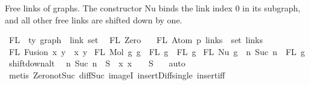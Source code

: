 \begin{isabellebody}
\begin{isamarkuptext}
Free links of graphs.
The constructor Nu binds the link index 0 in its subgraph,
and all other free links are shifted down by one.%
\end{isamarkuptext}\isamarkuptrue%
\isamarkupfalse%
\ FL\ {\isacharcolon}{\kern0pt}{\isacharcolon}{\kern0pt}\ {\isachardoublequoteopen}{\isacharprime}{\kern0pt}ty\ graph\ {\isacharequal}{\kern0pt}{\isachargreater}{\kern0pt}\ link\ set{\isachardoublequoteclose}\isanewline
{}\isanewline
\ \ {\isachardoublequoteopen}FL\ Zero\ {\isacharequal}{\kern0pt}\ {\isacharbraceleft}{\kern0pt}{\isacharbraceright}{\kern0pt}{\isachardoublequoteclose}\isanewline
{\isacharbar}{\kern0pt}\ {\isachardoublequoteopen}FL\ {\isacharparenleft}{\kern0pt}Atom\ p\ links{\isacharparenright}{\kern0pt}\ {\isacharequal}{\kern0pt}\ set\ links{\isachardoublequoteclose}\isanewline
{\isacharbar}{\kern0pt}\ {\isachardoublequoteopen}FL\ {\isacharparenleft}{\kern0pt}Fusion\ x\ y{\isacharparenright}{\kern0pt}\ {\isacharequal}{\kern0pt}\ {\isacharbraceleft}{\kern0pt}x{\isacharcomma}{\kern0pt}\ y{\isacharbraceright}{\kern0pt}{\isachardoublequoteclose}\isanewline
{\isacharbar}{\kern0pt}\ {\isachardoublequoteopen}FL\ {\isacharparenleft}{\kern0pt}Mol\ g{}\ g{}{\isacharparenright}{\kern0pt}\ {\isacharequal}{\kern0pt}\ FL\ g{}\ {\isasymunion}\ FL\ g{}{\isachardoublequoteclose}\isanewline
{\isacharbar}{\kern0pt}\ {\isachardoublequoteopen}FL\ {\isacharparenleft}{\kern0pt}Nu\ g{\isacharparenright}{\kern0pt}\ {\isacharequal}{\kern0pt}\ {\isacharbraceleft}{\kern0pt}n{\isachardot}{\kern0pt}\ Suc\ n\ {\isasymin}\ FL\ g{\isacharbraceright}{\kern0pt}{\isachardoublequoteclose}\isanewline
\isanewline
\isanewline
{}\isamarkupfalse%
\ shift{\isacharunderscore}{\kern0pt}down{\isacharunderscore}{\kern0pt}alt{\isacharcolon}{\kern0pt}\isanewline
\ \ {\isachardoublequoteopen}{\isacharbraceleft}{\kern0pt}n{\isachardot}{\kern0pt}\ Suc\ n\ {\isasymin}\ S{\isacharbraceright}{\kern0pt}\ {\isacharequal}{\kern0pt}\ {\isacharparenleft}{\kern0pt}{\isasymlambda}x{\isachardot}{\kern0pt}\ x\ {\isacharminus}{\kern0pt}\ {}{\isacharparenright}{\kern0pt}\ {\isacharbackquote}{\kern0pt}\ {\isacharparenleft}{\kern0pt}S\ {\isacharminus}{\kern0pt}\ {\isacharbraceleft}{\kern0pt}{}{\isacharbraceright}{\kern0pt}{\isacharparenright}{\kern0pt}{\isachardoublequoteclose}\isanewline
%
\isadelimproof
%
\endisadelimproof
%
\isatagproof
{}\isamarkupfalse%
\ auto\isanewline
{}\isamarkupfalse%
\ {\isacharparenleft}{\kern0pt}metis\ Zero{\isacharunderscore}{\kern0pt}not{\isacharunderscore}{\kern0pt}Suc\ diff{\isacharunderscore}{\kern0pt}Suc{\isacharunderscore}{\kern0pt}{}{\isacharprime}{\kern0pt}\ imageI\ insert{\isacharunderscore}{\kern0pt}Diff{\isacharunderscore}{\kern0pt}single\ insert{\isacharunderscore}{\kern0pt}iff{\isacharparenright}{\kern0pt}%

\end{isabellebody}
